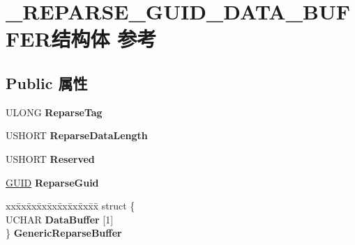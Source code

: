 \hypertarget{struct___r_e_p_a_r_s_e___g_u_i_d___d_a_t_a___b_u_f_f_e_r}{}\section{\+\_\+\+R\+E\+P\+A\+R\+S\+E\+\_\+\+G\+U\+I\+D\+\_\+\+D\+A\+T\+A\+\_\+\+B\+U\+F\+F\+E\+R结构体 参考}
\label{struct___r_e_p_a_r_s_e___g_u_i_d___d_a_t_a___b_u_f_f_e_r}
\subsection*{Public 属性}
\begin{DoxyCompactItemize}
\item 
\mbox{\label{struct___r_e_p_a_r_s_e___g_u_i_d___d_a_t_a___b_u_f_f_e_r_a4f9843ebdac819f3602ebbfc00c198db}} 
U\+L\+O\+NG {\bfseries Reparse\+Tag}
\item 
\mbox{\label{struct___r_e_p_a_r_s_e___g_u_i_d___d_a_t_a___b_u_f_f_e_r_a2adb26ebbca9ea4ffa9becd2dac7f5c0}} 
U\+S\+H\+O\+RT {\bfseries Reparse\+Data\+Length}
\item 
\mbox{\label{struct___r_e_p_a_r_s_e___g_u_i_d___d_a_t_a___b_u_f_f_e_r_aef498e8c6fc849cdca0ae389450415d6}} 
U\+S\+H\+O\+RT {\bfseries Reserved}
\item 
\mbox{\label{struct___r_e_p_a_r_s_e___g_u_i_d___d_a_t_a___b_u_f_f_e_r_a86743093a8caeb753ba3c4a871ae01d8}} 
\hyperlink{interface_g_u_i_d}{G\+U\+ID} {\bfseries Reparse\+Guid}
\item 
\mbox{\label{struct___r_e_p_a_r_s_e___g_u_i_d___d_a_t_a___b_u_f_f_e_r_a2011317fb3eef98852e156031e9d65b2}} 
\begin{tabbing}
xx\=xx\=xx\=xx\=xx\=xx\=xx\=xx\=xx\=\kill
struct \{\\
\>UCHAR {\bfseries DataBuffer} \mbox{[}1\mbox{]}\\
\} {\bfseries GenericReparseBuffer}\\


\end{tabbing}
\end{DoxyCompactItemize}
